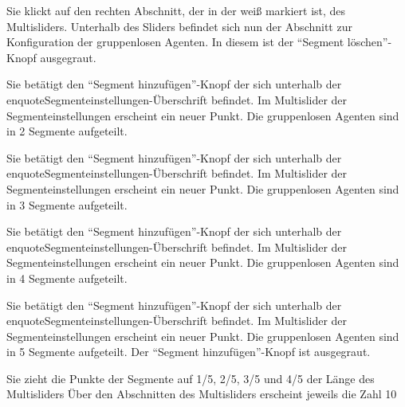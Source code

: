 \documentclass[parskip=full,11pt]{scrartcl}
\begin{document}
{Sie klickt auf den rechten Abschnitt, der in der weiß markiert ist, des Multisliders.}
{Unterhalb des Sliders befindet sich nun der Abschnitt zur Konfiguration der gruppenlosen Agenten. In diesem ist der \enquote{Segment löschen}-Knopf ausgegraut.}

{Sie betätigt den \enquote{Segment hinzufügen}-Knopf der sich unterhalb der enquote{Segmenteinstellungen}-Überschrift befindet.}
{Im Multislider der Segmenteinstellungen erscheint ein neuer Punkt. Die gruppenlosen Agenten sind in 2 Segmente aufgeteilt.}

{Sie betätigt den \enquote{Segment hinzufügen}-Knopf der sich unterhalb der enquote{Segmenteinstellungen}-Überschrift befindet.}
{Im Multislider der Segmenteinstellungen erscheint ein neuer Punkt. Die gruppenlosen Agenten sind in 3 Segmente aufgeteilt.}

{Sie betätigt den \enquote{Segment hinzufügen}-Knopf der sich unterhalb der enquote{Segmenteinstellungen}-Überschrift befindet.}
{Im Multislider der Segmenteinstellungen erscheint ein neuer Punkt. Die gruppenlosen Agenten sind in 4 Segmente aufgeteilt.}

{Sie betätigt den \enquote{Segment hinzufügen}-Knopf der sich unterhalb der enquote{Segmenteinstellungen}-Überschrift befindet.}
{Im Multislider der Segmenteinstellungen erscheint ein neuer Punkt. Die gruppenlosen Agenten sind in 5 Segmente aufgeteilt. Der \enquote{Segment hinzufügen}-Knopf ist ausgegraut.}

{Sie zieht die Punkte der Segmente auf 1/5, 2/5, 3/5 und 4/5 der Länge des Multisliders}
{Über den Abschnitten des Multisliders erscheint jeweils die Zahl 10}
\end{document}
